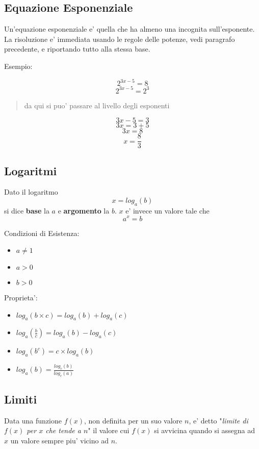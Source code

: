 \documentclass{article}
\begin{document}
{  \pagebreak

  \subsection{Equazione Esponenziale}
  Un'equazione esponenziale e' quella che ha almeno una incognita sull'esponente. La risoluzione e' immediata usando le regole delle potenze, vedi paragrafo precedente, e riportando tutto alla stessa base.

  Esempio:

  $$ 2^{3x - 5} = 8 $$
  $$ 2^{3x - 5} = 2^3 $$

  \begin{quote}
    da qui si puo' passare al livello degli esponenti
  \end{quote}

  $$ 3x - 5 = 3 $$
  $$ 3x = 3 + 5 $$
  $$ 3x = 8 $$
  $$ x = \frac{8}{3} $$

  \subsection{Logaritmi}
  Dato il logaritmo
  $$ x = log_a(b) $$
  si dice \textbf{base} la $ a $ e \textbf{argomento} la $ b $. $ x $ e' invece un valore tale che
  $$ a^x = b $$

  Condizioni di Esistenza:
  \begin{itemize}
    \item $ a \neq 1 $
    \item $ a > 0 $
    \item $ b > 0 $
  \end{itemize}

  Proprieta':
  \begin{itemize}
    \item $ log_a(b \times c) = log_a(b) + log_a(c) $
    \item $ log_a(\frac{b}{c}) = log_a(b) - log_a(c) $
    \item $ log_a(b^c) = c \times log_a(b) $
    \item $ log_a(b) = \frac{log_c(b)}{log_c(a)} $
  \end{itemize}

  \subsection{Limiti}
  Data una funzione $ f(x) $, non definita per un suo valore $ n $, e' detto "\textit{limite di $ f(x) $ per $ x $ che tende a $ n $}" il valore cui $ f(x) $ si avvicina quando si assegna ad $ x $ un valore sempre piu' vicino ad $ n $.

}
\end{document}
